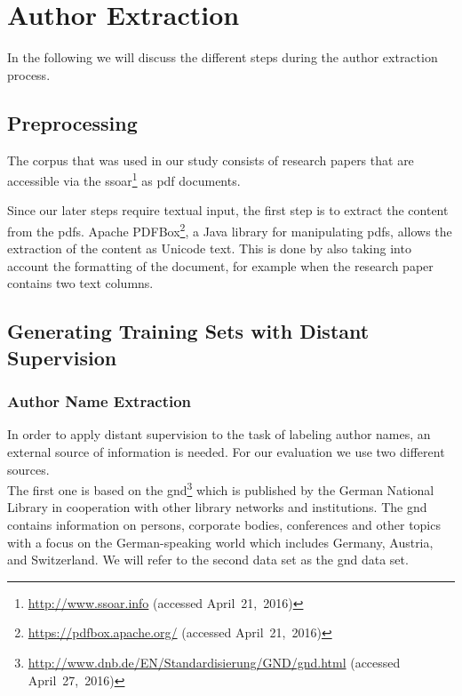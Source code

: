 \chapter{Author Extraction}\label{cha:author-extraction}

In the following we will discuss the different steps during the author extraction process.

\section{Preprocessing}\label{sec:ae-preprocessing}

The corpus that was used in our study consists of  research papers that are accessible via the \gls{ssoar}\footnote{\url{http://www.ssoar.info} (accessed April~21,~2016)} as \gls{pdf} documents.

Since our later steps require textual input, the first step is to extract the content from the \glspl{pdf}.
Apache PDFBox\footnote{\url{https://pdfbox.apache.org/} (accessed April~21,~2016)}, a Java library for manipulating \glspl{pdf}, allows the extraction of the content as Unicode text.
This is done by also taking into account the formatting of the document, for example when the research paper contains two text columns.

\section{Generating Training Sets with Distant Supervision}\label{sec:ae-distant-supervision}

\subsection{Author Name Extraction}

In order to apply distant supervision to the task of labeling author names, an external source of information is needed.
For our evaluation we use two different sources.\\

The first one is based on the \acrfull{gnd}\footnote{\url{http://www.dnb.de/EN/Standardisierung/GND/gnd.html} (accessed April~27,~2016)} which is published by the German National Library in cooperation with other library networks and institutions.
The \gls{gnd} contains information on persons, corporate bodies, conferences and other topics with a focus on the German-speaking world which includes Germany, Austria, and Switzerland.
We will refer to the second data set as the \gls{gnd} data set.\\

